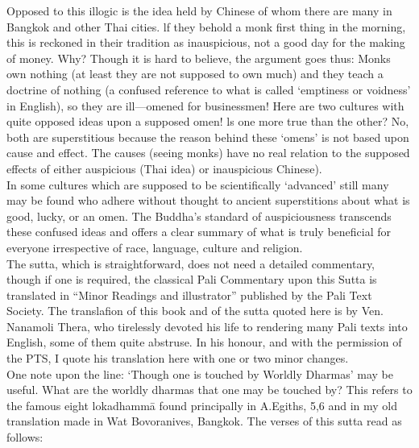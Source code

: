 Opposed to this illogic is the idea held by Chinese of whom there are many in Bangkok and other Thai cities. lf they behold a monk first thing in the morning, this is reckoned in their tradition as inauspicious, not a good day for the making of money. Why? Though it is hard to believe, the argument goes thus: Monks own nothing (at least they are not supposed to own much) and they teach a doctrine of nothing (a confused reference to what is called `emptiness or voidness' in English), so they are ill—omened for businessmen! Here are two cultures with quite opposed ideas upon a supposed omen! ls one more true than the other? No, both are superstitious because the reason behind these `omens' is not based upon cause and effect. The causes (seeing monks) have no real relation to the supposed effects of either auspicious (Thai idea) or inauspicious Chinese).\\

In some cultures which are supposed to be scientifically `advanced' still many may be found who adhere without thought to ancient superstitions about what is good, lucky, or an omen. The Buddha's standard of auspiciousness transcends these confused ideas and offers a clear summary of what is truly beneﬁcial for everyone irrespective of race, language, culture and religion.\\

The sutta, which is straightforward, does not need a detailed commentary, though if one is required, the classical Pali Commentary upon this Sutta is translated in “Minor Readings and illustrator” published by the Pali Text Society. The translaﬁon of this book and of the sutta quoted here is by Ven. Nanamoli Thera, who tirelessly devoted his life to rendering many Pali texts into English, some of them quite abstruse. In his honour, and with the permission of the PTS, I quote his translation here with one or two minor changes.\\

One note upon the line: `Though one is touched by Worldly Dharmas' may be useful. What are the worldly dharmas that one may be touched by? This refers to the famous eight lokadhamm\=a found principally in A.Egiths, 5,6 and in my old translation made in Wat Bovoranives, Bangkok. The verses of this sutta read as follows:

